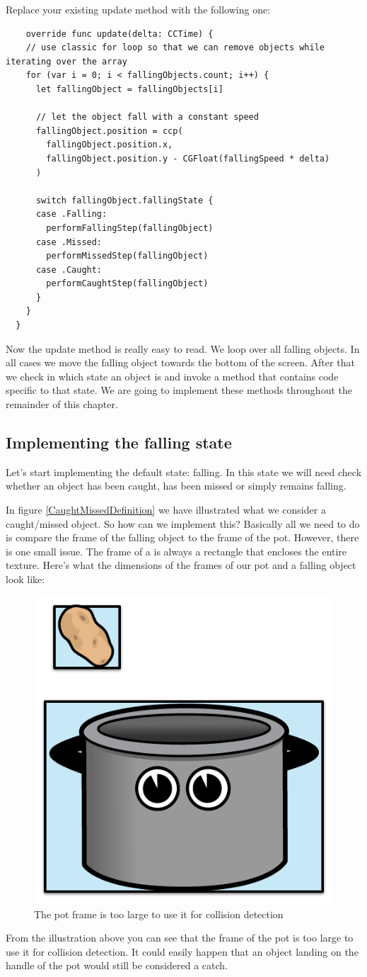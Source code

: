 \begin{leftbar}
Replace your existing update method with the following one:
\begin{lstlisting}
    override func update(delta: CCTime) {
    // use classic for loop so that we can remove objects while iterating over the array
    for (var i = 0; i < fallingObjects.count; i++) {
      let fallingObject = fallingObjects[i]
      
      // let the object fall with a constant speed
      fallingObject.position = ccp(
        fallingObject.position.x,
        fallingObject.position.y - CGFloat(fallingSpeed * delta)
      )
      
      switch fallingObject.fallingState {
      case .Falling:
        performFallingStep(fallingObject)
      case .Missed:
        performMissedStep(fallingObject)
      case .Caught:
        performCaughtStep(fallingObject)
      }
    }
  }
\end{lstlisting}
\end{leftbar} 
Now the update method is really easy to read. We loop over all falling objects.
In all cases we move the falling object towards the bottom of the screen. After
that we check in which state an object is and invoke a method that contains code
specific to that state. We are going to implement these methods throughout the
remainder of this chapter.

\subsection{Implementing the falling state}
Let's start implementing the default state: falling. In this state we will need
check whether an object has been caught, has been missed or simply remains
falling. 

In figure \ref{CaughtMissedDefinition} we have illustrated what we consider a
caught/missed object. So how can we implement this? Basically all we need to do
is compare the frame of the falling object to the frame of the pot. However,
there is one small issue. The frame of a \ccsprite{} is always a rectangle that
encloses the entire texture. Here's what the dimensions of the frames of our pot
and a falling object look like:
\begin{figure}[H]
		\centering
		\includegraphics[width=0.3\linewidth]{images/Chapter3/frame_pot_falling_object.png}
		\caption{The pot frame is too large to use it for collision detection}
\end{figure}
From the illustration above you can see that the frame of the pot is too large
to use it for collision detection. It could easily happen that an object
landing on the handle of the pot would still be considered a catch.

